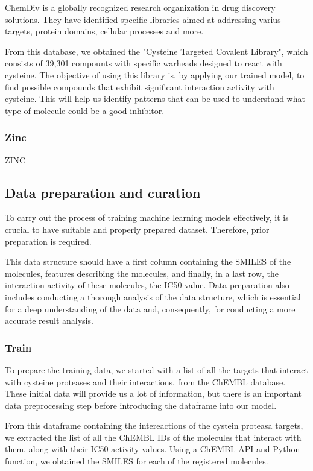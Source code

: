 \documentclass[final,times,twocolumn,article]{elsarticle}
\begin{document}
ChemDiv is a globally recognized research organization in drug discovery solutions. They have identified specific libraries aimed at addressing varius targets, protein domains, cellular processes and more. \cite{chemdivweb}

From this database, we obtained the "Cysteine Targeted Covalent Library", which consists of 39,301 compounts with specific warheads designed to react with cysteine. The objective of using this library is, by applying our trained model, to find possible compounds that exhibit significant interaction activity with cysteine. This will help us identify patterns that can be used to understand what type of molecule could be a good inhibitor. 

\subsubsection{Zinc}

ZINC

\subsection{Data preparation and curation}

To carry out the process of training machine learning models effectively, it is crucial to have suitable and properly prepared dataset. Therefore, prior preparation is required. 

This data structure should have a first column containing the SMILES of the molecules, features describing the molecules, and finally, in a last row, the interaction activity of these molecules, the IC50 value. Data preparation also includes conducting a thorough analysis of the data structure, which is essential for a deep understanding of the data and, consequently, for conducting a more accurate result analysis. 

\subsubsection{Train}

To prepare the training data, we started with a list of all the targets that interact with cysteine proteases and their interactions, from the ChEMBL database. These initial data will provide us a lot of information, but there is an important data preprocessing step before introducing the dataframe into our model. 

From this dataframe containing the intereactions of the cystein proteasa targets, we extracted the list of all the ChEMBL IDs of the molecules that interact with them, along with their IC50 activity values. Using a ChEMBL API and Python function, we obtained the SMILES for each of the registered molecules. 
\end{document}
